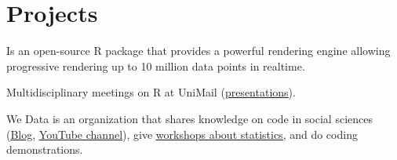 \documentclass[]{plushcv}
\begin{document}
\begin{minipage}[t]{0.25\textwidth}
\sectionsep
\runsubsection{}
\sectionsep
\sectionsep




\end{minipage} 
\clearpage
\begin{minipage}[t]{0.70\textwidth} 
\sectionsep
\sectionsep
\sectionsep
\sectionsep
\sectionsep
\sectionsep
\sectionsep
\sectionsep





\section{Projects}
\sectionsep


\sectionsep
\sectionsep
{}
\begin{tightemize}
\item Is an open-source R package that provides a powerful rendering engine allowing progressive rendering up to 10 million data points in realtime.
\end{tightemize}
\sectionsep


\sectionsep
{}
\begin{tightemize}
\item Multidisciplinary meetings on R at UniMail (\href{https://use-r-carlvogt.github.io/prochains-lunchs/}{\underline{presentations}}). 
\end{tightemize}
\sectionsep



\sectionsep
{}
\begin{tightemize}
\item We Data is an organization that shares knowledge on code in social sciences (\href{https://wedata.ch/}{\underline{Blog}}, \href{https://www.youtube.com/channel/UCGktdbvbc_H-JEkYYTvwRVw}{\underline{YouTube channel}}), give \href{https://github.com/we-data-ch/workshops}{\underline{workshops about statistics}}, and do coding demonstrations. 
\end{tightemize}
\sectionsep


\end{minipage}
\end{document}
